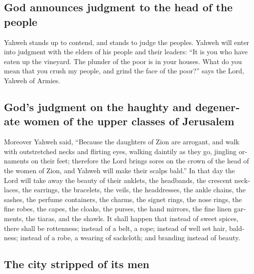 \begin{paracol}{2}
\begin{otherlanguage}{english}
\hypertarget{god-announces-judgment-to-the-head-of-the-people}{%
\subsection{God announces judgment to the head of the
people}\label{god-announces-judgment-to-the-head-of-the-people}}

 Yahweh stands up to contend, and stands to judge the
peoples.  Yahweh will enter into judgment with the elders
of his people and their leaders: ``It is you who have eaten up the
vineyard. The plunder of the poor is in your houses. 
What do you mean that you crush my people, and grind the face of the
poor?'' says the Lord, Yahweh of Armies.

\hypertarget{gods-judgment-on-the-haughty-and-degenerate-women-of-the-upper-classes-of-jerusalem}{%
\subsection{God's judgment on the haughty and degenerate women of the
upper classes of
Jerusalem}\label{gods-judgment-on-the-haughty-and-degenerate-women-of-the-upper-classes-of-jerusalem}}

 Moreover Yahweh said, ``Because the daughters of Zion
are arrogant, and walk with outstretched necks and flirting eyes,
walking daintily as they go, jingling ornaments on their feet;
 therefore the Lord brings sores on the crown of the head
of the women of Zion, and Yahweh will make their scalps bald.''
 In that day the Lord will take away the beauty of their
anklets, the headbands, the crescent necklaces,  the
earrings, the bracelets, the veils,  the headdresses, the
ankle chains, the sashes, the perfume containers, the charms,
 the signet rings, the nose rings,  the
fine robes, the capes, the cloaks, the purses,  the hand
mirrors, the fine linen garments, the tiaras, and the shawls.
 It shall happen that instead of sweet spices, there
shall be rottenness; instead of a belt, a rope; instead of well set
hair, baldness; instead of a robe, a wearing of sackcloth; and branding
instead of beauty.

\hypertarget{the-city-stripped-of-its-men}{%
\subsection{The city stripped of its
men}\label{the-city-stripped-of-its-men}}


\end{otherlanguage}
\end{paracol}
